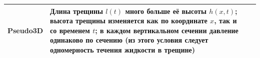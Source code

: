 \begin{longtable}[l]{|L{2.2cm}|m{7.3cm}|L{6.2cm}|}
	Pseudo3D&Длина трещины $l(t)$ много больше её высоты $h(x,t)$; высота трещины изменяется как по координате $x$, так и со временем $t$; в каждом вертикальном сечении давление одинаково по сечению (из этого условия следует одномерность течения жидкости в трещине)&\hfill\break{}\hfill\break\\ \hline

\end{longtable}
